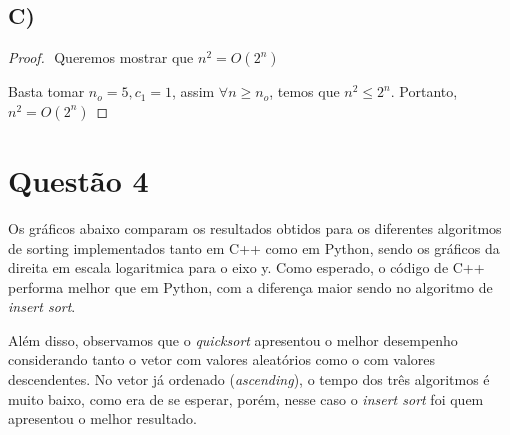 \documentclass{article}
\begin{document}
\subsection*{C)}
\begin{proof}
$ $\newline
Queremos mostrar que $n^2 = O(2^n)$

Basta tomar $n_o=5,c_1=1$, assim $\forall n\geq n_o$, temos que $n^2\leq 2^n$. Portanto, $n^2 = O(2^n)$

\end{proof}


\section*{Questão 4}

Os gráficos abaixo comparam os resultados obtidos para os diferentes algoritmos de sorting
implementados tanto em C++ como em Python, sendo os gráficos da direita em escala logaritmica para o eixo y.
Como esperado, o código de C++ performa melhor
que em Python, com a diferença maior sendo no algoritmo de {\it insert sort}.

Além disso, observamos que o {\it quicksort} apresentou o melhor
desempenho considerando tanto o vetor com valores aleatórios como o com
valores descendentes.
No vetor já ordenado ({\it ascending}), o tempo dos três algoritmos é muito baixo, como
era de se esperar, porém, nesse caso o {\it insert sort} foi quem apresentou o melhor
resultado.
\end{document}
